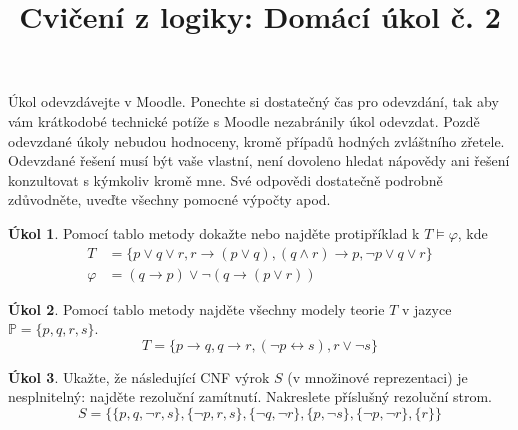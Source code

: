 \documentclass{amsart}
\title{\sc Cvičení z logiky: Domácí úkol č. 2}
\theoremstyle{definition}
\newtheorem{task}{Úkol}
\begin{document}
\maketitle

\thispagestyle{empty}

Úkol odevzdávejte v Moodle. Ponechte si dostatečný čas pro odevzdání, tak aby vám krátkodobé technické potíže s Moodle nezabránily úkol odevzdat. Pozdě odevzdané úkoly nebudou hodnoceny, kromě případů hodných zvláštního zřetele. Odevzdané řešení musí být vaše vlastní, není dovoleno hledat nápovědy ani řešení konzultovat s kýmkoliv kromě mne. Své odpovědi dostatečně podrobně zdůvodněte, uveďte všechny pomocné výpočty apod.


\begin{task}
Pomocí tablo metody dokažte nebo najděte protipříklad k $T\models\varphi$, kde
\begin{align*}
T&=\{ p \vee q \vee r, r \to (p \vee q), (q \wedge r) \to p, \neg p \vee q \vee r \}\\
\varphi&=(q \to p) \vee \neg (q \to (p\vee r))
\end{align*}
\end{task}

\bigskip

\begin{task}
Pomocí tablo metody najděte všechny modely teorie $T$ v jazyce $\mathbb P=\{p,q,r,s\}$.
$$T=\{p \to q, q \to r, (\neg p \leftrightarrow s), r\vee\neg s\}$$ 
\end{task}

\bigskip

\begin{task}
Ukažte, že následující CNF výrok $S$ (v množinové reprezentaci) je nesplnitelný: najděte rezoluční zamítnutí. Nakreslete příslušný rezoluční strom.
$$
S=\{\{p,q, \neg r,s\}, \{\neg p,r,s\}, \{\neg q, \neg r\}, \{p, \neg s\}, \{\neg p, \neg r\}, \{r\}\}
$$
\end{task}


\bigskip
\end{document}
